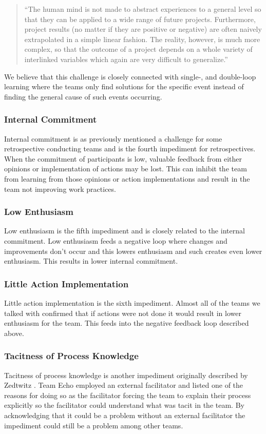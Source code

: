 \begin{quote}
``The human mind is not made to abstract experiences to a general level so that they can be applied to a wide range of future projects. Furthermore, project results (no matter if they are positive or negative) are often naively extrapolated in a simple linear fashion. The reality, however, is much more complex, so that the outcome of a project depends on a whole variety of interlinked variables which again are very difficult to generalize.''
\end{quote}

We believe that this challenge is closely connected with single-, and double-loop learning where the teams only find solutions for the specific event instead of finding the general cause of such events occurring.

\subsubsection{Internal Commitment}
Internal commitment is as previously mentioned a challenge for some retrospective conducting teams and is the fourth impediment for retrospectives. When the commitment of participants is low, valuable feedback from either opinions or implementation of actions may be lost. This can inhibit the team from learning from those opinions or action implementations and result in the team not improving work practices. 

\subsubsection{Low Enthusiasm}
Low enthusiasm is the fifth impediment and is closely related to the internal commitment. Low enthusiasm feeds a negative loop where changes and improvements don't occur and this lowers enthusiasm and such creates even lower enthusiasm. This results in lower internal commitment. 

\subsubsection{Little Action Implementation}
Little action implementation is the sixth impediment. Almost all of the teams we talked with confirmed that if actions were not done it would result in lower enthusiasm for the team. This feeds into the negative feedback loop described above.

\subsubsection{Tacitness of Process Knowledge}
Tacitness of process knowledge is another impediment originally described by Zedtwitz \cite{Zedtwitz2002}. Team Echo employed an external facilitator and listed one of the reasons for doing so as the facilitator forcing the team to explain their process explicitly so the facilitator could understand what was tacit in the team. By acknowledging that it could be a problem without an external facilitator the impediment could still be a problem among other teams. 

